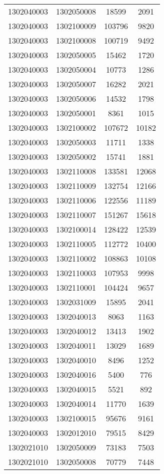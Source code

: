 \begin{longtable}{llcc}
1302040003 & 1302050008 & 18599 & 2091\\
1302040003 & 1302100009 & 103796 & 9820\\
1302040003 & 1302100008 & 100719 & 9492\\
1302040003 & 1302050005 & 15462 & 1720\\
1302040003 & 1302050004 & 10773 & 1286\\
1302040003 & 1302050007 & 16282 & 2021\\
1302040003 & 1302050006 & 14532 & 1798\\
1302040003 & 1302050001 & 8361 & 1015\\
1302040003 & 1302100002 & 107672 & 10182\\
1302040003 & 1302050003 & 11711 & 1338\\
1302040003 & 1302050002 & 15741 & 1881\\
1302040003 & 1302110008 & 133581 & 12068\\
1302040003 & 1302110009 & 132754 & 12166\\
1302040003 & 1302110006 & 122556 & 11189\\
1302040003 & 1302110007 & 151267 & 15618\\
1302040003 & 1302100014 & 128422 & 12539\\
1302040003 & 1302110005 & 112772 & 10400\\
1302040003 & 1302110002 & 108863 & 10108\\
1302040003 & 1302110003 & 107953 & 9998\\
1302040003 & 1302110001 & 104424 & 9657\\
1302040003 & 1302031009 & 15895 & 2041\\
1302040003 & 1302040013 & 8063 & 1163\\
1302040003 & 1302040012 & 13413 & 1902\\
1302040003 & 1302040011 & 13029 & 1689\\
1302040003 & 1302040010 & 8496 & 1252\\
1302040003 & 1302040016 & 5400 & 776\\
1302040003 & 1302040015 & 5521 & 892\\
1302040003 & 1302040014 & 11770 & 1639\\
1302040003 & 1302100015 & 95676 & 9161\\
1302040003 & 1302012010 & 79515 & 8429\\
1302021010 & 1302050009 & 73183 & 7503\\
1302021010 & 1302050008 & 70779 & 7448\\

\end{longtable}
